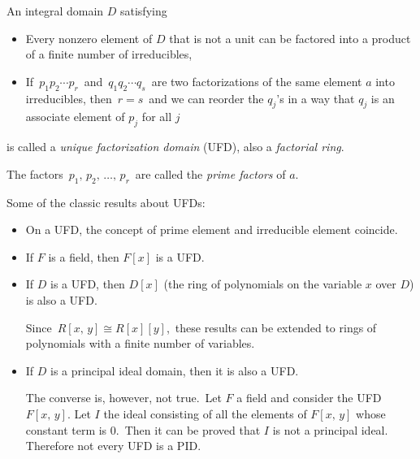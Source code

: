 \documentclass{article}
\begin{document}
An integral domain $D$ satisfying
\begin{itemize}
\item Every nonzero element of $D$ that is not a unit can be factored into a product of a finite number of irreducibles,
\item If\, $p_1p_2\cdots p_r$\, and\, $q_1q_2\cdots q_s$\, are two factorizations of the same element $a$ into irreducibles, then\, $r = s$\, and we can reorder the $q_j$'s in a way that $q_j$ is an associate  element of $p_j$ for all $j$
\end{itemize}
is called a \emph{unique factorization domain} (UFD), also a {\em factorial ring}.

The factors\, $p_1,\,p_2,\,\ldots,\,p_r$\, are called the {\em prime factors} of $a$.

Some of the classic results about UFDs:
\begin{itemize}
\item {On a UFD, the concept of prime element and irreducible element coincide.}

\item {If $F$ is a field, then $F[x]$ is a UFD.}

\item If $D$ is a UFD, then $D[x]$ (the ring of polynomials on the variable $x$ over $D$) is also a UFD.

Since\, $R[x,\,y]\cong R[x][y]$,\, these results can be extended to rings of polynomials with a finite number of variables.

\item If $D$ is a principal ideal domain, then it is also a UFD.

The converse is, however, not true.\, Let $F$ a field and consider the UFD $F[x,\,y]$.
Let $I$ the ideal consisting of all the elements of $F[x,\,y]$ whose constant term  is $0$.\, Then it can be proved that $I$ is not a principal ideal.\, Therefore not every  UFD is a PID.
\end{itemize}
\end{document}
